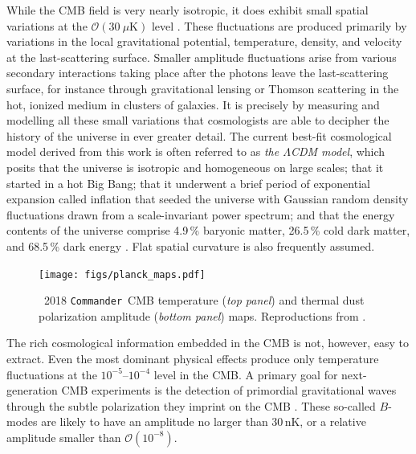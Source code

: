 \documentclass[twocolumn]{aa}
\def\commander{\texttt{Commander}}
\begin{document}
While the CMB field is very nearly isotropic, it does exhibit small
spatial variations at the $\mathcal{O}(30~\mu\mathrm{K})$ level
\citep[e.g.,][and references therein]{hu:2002}. These fluctuations are
produced primarily by variations in the local gravitational potential,
temperature, density, and velocity at the last-scattering surface.
Smaller amplitude fluctuations arise from various secondary
interactions taking place after the photons leave the last-scattering
surface, for instance through gravitational lensing or Thomson
scattering in the hot, ionized medium in clusters of galaxies. It is
precisely by measuring and modelling all these small variations that
cosmologists are able to decipher the history of the universe in ever
greater detail. The current best-fit cosmological model derived from
this work is often referred to as \emph{the $\mathit\Lambda$CDM
  model}, which posits that the universe is isotropic and homogeneous
on large scales; that it started in a hot Big Bang; that it underwent
a brief period of exponential expansion called inflation that seeded
the universe with Gaussian random density fluctuations drawn from a
scale-invariant power spectrum; and that the energy contents of the
universe comprise 4.9\,\% baryonic matter, 26.5\,\% cold dark
matter, and 68.5\,\% dark energy \citep{planck2016-l06}. Flat spatial
curvature is also frequently assumed.

\begin{figure}[t]
  \center
  \texttt{[image: figs/planck\_maps.pdf]}
  \caption{\Planck\ 2018 \commander\ CMB temperature (\emph{top
      panel}) and thermal dust polarization amplitude (\emph{bottom
      panel}) maps. Reproductions from \citet{planck2016-l04}.    }\label{fig:planck_maps}
\end{figure}

The rich cosmological information embedded in the CMB is not, however,
easy to extract.  Even the most dominant physical effects produce only
temperature fluctuations at the $10^{-5}$--$10^{-4}$ level in the
CMB.  A primary goal for next-generation CMB experiments is the
detection of primordial gravitational waves through the subtle
polarization they imprint on the CMB \citep[e.g.,][and references
  therein]{kamionkowski:2016}.  These so-called $B$-modes are likely
to have an amplitude no larger than 30\,nK, or a relative amplitude
smaller than $\mathcal{O}(10^{-8})$.
\end{document}
